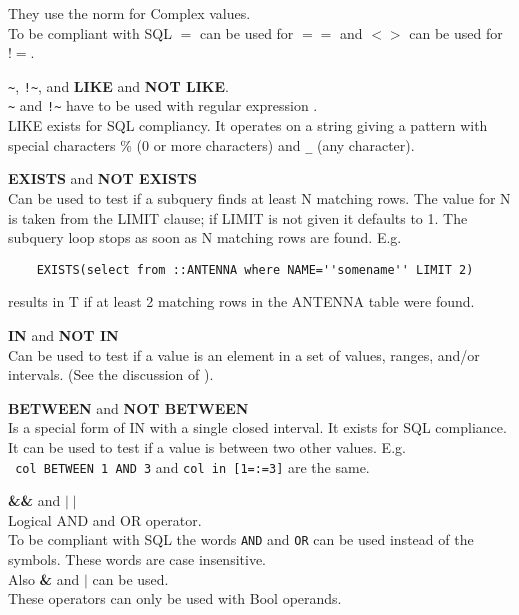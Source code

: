 \begin{description}
       They use the norm for Complex values.
       \\To be compliant with SQL $=$ can be used for
       $==$ and $<>$ can be used for $!=$.
  \item[] \verb+~+, \verb+!~+, and \textbf{LIKE} and
	  \textbf{NOT LIKE}.
       \\\verb+~+ and \verb+!~+ have to be used with regular expression
       .
       \\LIKE exists for SQL compliancy. It operates on a string
       giving a pattern with special characters \% (0 or more
       characters) and \verb+_+ (any character). 
  \item[] \textbf{EXISTS} and \textbf{NOT EXISTS}
       \\Can be used to test if a subquery finds at least N matching rows.
       The value for N is taken from the LIMIT clause; if LIMIT is
       not given it defaults to 1. The subquery loop stops as soon as
       N matching rows are found.
       E.g.
       \begin{verbatim}
    EXISTS(select from ::ANTENNA where NAME=''somename'' LIMIT 2)
       \end{verbatim}
       results in T if at least 2 matching rows in the ANTENNA table
       were found.
  \item[] \textbf{IN} and \textbf{NOT IN}
       \\Can be used to test if a value is an element in a set of
       values, ranges, and/or intervals.
       (See the discussion of ).
  \item[] \textbf{BETWEEN} and \textbf{NOT BETWEEN}
       \\Is a special form of IN with a single closed interval.
       It exists for SQL compliance.
       It can be used to test if a value is between two other values.
       E.g.
       \\\texttt{   col BETWEEN 1 AND 3}  and  \texttt{col in [1=:=3]}
       are the same.
  \item[] \textbf{\&\&} and \textbf{$\mid\mid$}
       \\Logical AND and OR operator. 
       \\To be compliant with SQL the
       words \texttt{AND} and \texttt{OR} can be used instead of the
       symbols. These words are case insensitive.
       \\Also \textbf{\&} and \textbf{$\mid$} can be used.
       \\These operators can only be used with Bool operands.
\end{description}
